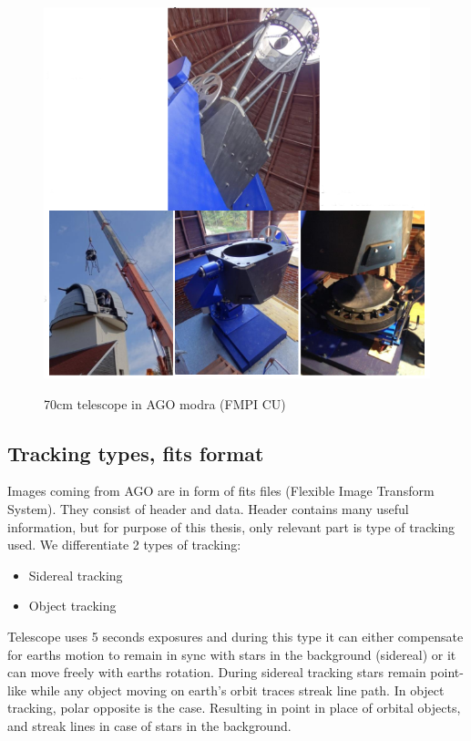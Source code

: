 \documentclass[12pt, a4paper, oneside]{book}
\begin{document}
\begin{figure}[!h]
    \begin{center}
        \includegraphics[scale=0.35]{images/telescope.png}
        \label{img:telescope}
        \caption{70cm telescope in AGO modra (FMPI CU)}
    \end{center}
\end{figure}

\subsection{Tracking types, fits format}
Images coming from AGO are in form of fits files (Flexible Image Transform System).
They consist of header and data.
Header contains many useful information, but for purpose of this thesis, only relevant part is type of tracking used.
We differentiate 2 types of tracking:
\begin{itemize}
    \item{Sidereal tracking}
    \item{Object tracking}
\end{itemize}

Telescope uses 5 seconds exposures and during this type it can either compensate for earths motion to remain in sync with stars in the background (sidereal) or it can move freely with earths rotation.
During sidereal tracking stars remain point-like while any object moving on earth's orbit traces streak line path.
In object tracking, polar opposite is the case.
Resulting in point in place of orbital objects, and streak lines in case of stars in the background.
\end{document}
